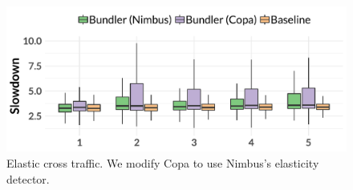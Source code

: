\begin{figure}
    \centering
\begin{knitrout}
\color{fgcolor}
\includegraphics[width=\maxwidth]{figure/robust:cr-elastic-1} 

\end{knitrout}
    \caption{Elastic cross traffic. We modify Copa to use Nimbus's elasticity detector.}
    \label{fig:robust:cr-elastic}
\end{figure}
